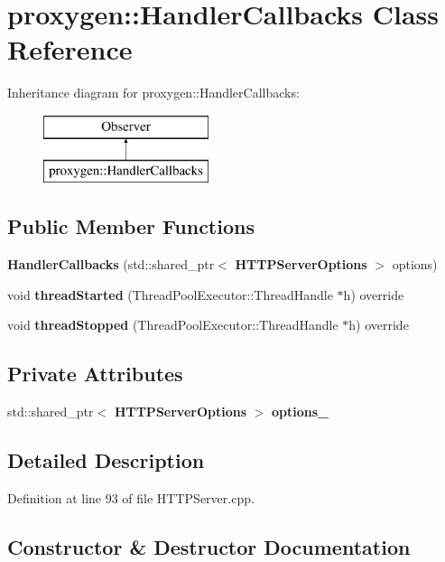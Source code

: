 \section{proxygen\+:\+:Handler\+Callbacks Class Reference}
\label{classproxygen_1_1HandlerCallbacks}
Inheritance diagram for proxygen\+:\+:Handler\+Callbacks\+:\begin{figure}[H]
\begin{center}
\leavevmode
\includegraphics[height=2.000000cm]{classproxygen_1_1HandlerCallbacks}
\end{center}
\end{figure}
\subsection*{Public Member Functions}
\begin{DoxyCompactItemize}
\item 
{\bf Handler\+Callbacks} (std\+::shared\+\_\+ptr$<$ {\bf H\+T\+T\+P\+Server\+Options} $>$ options)
\item 
void {\bf thread\+Started} (Thread\+Pool\+Executor\+::\+Thread\+Handle $\ast$h) override
\item 
void {\bf thread\+Stopped} (Thread\+Pool\+Executor\+::\+Thread\+Handle $\ast$h) override
\end{DoxyCompactItemize}
\subsection*{Private Attributes}
\begin{DoxyCompactItemize}
\item 
std\+::shared\+\_\+ptr$<$ {\bf H\+T\+T\+P\+Server\+Options} $>$ {\bf options\+\_\+}
\end{DoxyCompactItemize}


\subsection{Detailed Description}


Definition at line 93 of file H\+T\+T\+P\+Server.\+cpp.



\subsection{Constructor \& Destructor Documentation}
